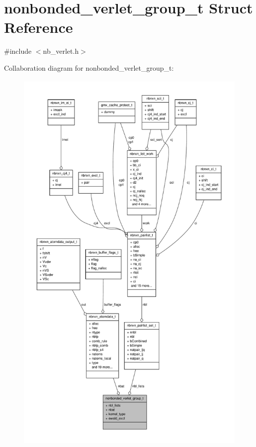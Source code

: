 \hypertarget{structnonbonded__verlet__group__t}{\section{nonbonded\-\_\-verlet\-\_\-group\-\_\-t \-Struct \-Reference}
\label{structnonbonded__verlet__group__t}
}


{\ttfamily \#include $<$nb\-\_\-verlet.\-h$>$}



\-Collaboration diagram for nonbonded\-\_\-verlet\-\_\-group\-\_\-t\-:
\nopagebreak
\begin{figure}[H]
\begin{center}
\leavevmode
\includegraphics[height=550pt]{structnonbonded__verlet__group__t__coll__graph}
\end{center}
\end{figure}
